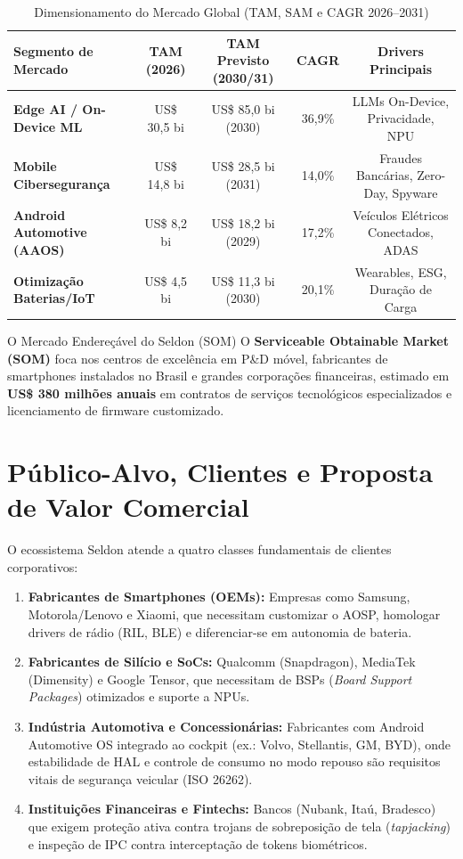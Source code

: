 \begin{table}[htbp]
\centering
\small
\caption{Dimensionamento do Mercado Global (TAM, SAM e CAGR 2026--2031)}
\label{tab:tam_sam}
\begin{tabular}{|l|c|c|c|c|}
\hline
\textbf{Segmento de Mercado} & \textbf{TAM (2026)} & \textbf{TAM Previsto (2030/31)} & \textbf{CAGR} & \textbf{Drivers Principais} \\ \hline
\textbf{Edge AI / On-Device ML} & US\$ 30,5 bi & US\$ 85,0 bi (2030) & 36,9\% & LLMs On-Device, Privacidade, NPU \\ \hline
\textbf{Mobile Cibersegurança} & US\$ 14,8 bi & US\$ 28,5 bi (2031) & 14,0\% & Fraudes Bancárias, Zero-Day, Spyware \\ \hline
\textbf{Android Automotive (AAOS)} & US\$ 8,2 bi & US\$ 18,2 bi (2029) & 17,2\% & Veículos Elétricos Conectados, ADAS \\ \hline
\textbf{Otimização Baterias/IoT} & US\$ 4,5 bi & US\$ 11,3 bi (2030) & 20,1\% & Wearables, ESG, Duração de Carga \\ \hline
\end{tabular}
\end{table}

\begin{casopratico}{O Mercado Endereçável do Seldon (SOM)}
O \textbf{Serviceable Obtainable Market (SOM)} foca nos centros de excelência em P\&D móvel, fabricantes de smartphones instalados no Brasil e grandes corporações financeiras, estimado em \textbf{US\$ 380 milhões anuais} em contratos de serviços tecnológicos especializados e licenciamento de firmware customizado.
\end{casopratico}

\section{Público-Alvo, Clientes e Proposta de Valor Comercial}

O ecossistema Seldon atende a quatro classes fundamentais de clientes corporativos:

\begin{enumerate}
    \item \textbf{Fabricantes de Smartphones (OEMs):} Empresas como Samsung, Motorola/Lenovo e Xiaomi, que necessitam customizar o AOSP, homologar drivers de rádio (RIL, BLE) e diferenciar-se em autonomia de bateria.
    \item \textbf{Fabricantes de Silício e SoCs:} Qualcomm (Snapdragon), MediaTek (Dimensity) e Google Tensor, que necessitam de BSPs (\textit{Board Support Packages}) otimizados e suporte a NPUs.
    \item \textbf{Indústria Automotiva e Concessionárias:} Fabricantes com Android Automotive OS integrado ao cockpit (ex.: Volvo, Stellantis, GM, BYD), onde estabilidade de HAL e controle de consumo no modo repouso são requisitos vitais de segurança veicular (ISO 26262).
    \item \textbf{Instituições Financeiras e Fintechs:} Bancos (Nubank, Itaú, Bradesco) que exigem proteção ativa contra trojans de sobreposição de tela (\textit{tapjacking}) e inspeção de IPC contra interceptação de tokens biométricos.
\end{enumerate}


